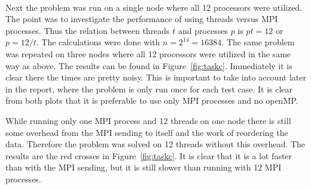 %
\\
Next the problem was run on a single node where all 12 processors were utilized. The point was to investigate the performance of using threads versus MPI processes. Thus the relation between threads $t$ and processes $p$ is $p t = 12$ or $p = 12/t$. The calculations were done with $n = 2^{14} = 16384$. 
The same problem was repeated on three nodes where all 12 processors were utilized in the same way as above. The results can be found in Figure~\ref{fig:taskc}. Immediately it is clear there the times are pretty noisy. This is important to take into account later in the report, where the problem is only run once for each test case. It is clear from both plots that it is preferable to use only MPI processes and no openMP. 

While running only one MPI process and 12 threads on one node there is still some overhead from the MPI sending to itself and the work of reordering the data. Therefore the problem was solved on 12 threads without this overhead. The results are the red crosses in Figure~\ref{fig:taskc}. It is clear that it is a lot faster than with the MPI sending, but it is still slower than running with 12 MPI processes. 
\\
